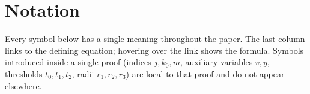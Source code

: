 \documentclass[11pt,reqno]{amsart}
\numberwithin{equation}{section}
\theoremstyle{plain}
\theoremstyle{definition}
\theoremstyle{remark}
\begin{document}
\maketitle
{}

\tableofcontents

\section*{Notation}
\label{sec:notation}

Every symbol below has a single meaning throughout the paper.  The last column links to the defining equation; hovering over the link shows the formula.  Symbols introduced inside a single proof (indices $j,k_0,m$, auxiliary variables $v,y$, thresholds $t_0,t_1,t_2$, radii $r_1,r_2,r_3$) are local to that proof and do not appear elsewhere.
\end{document}
